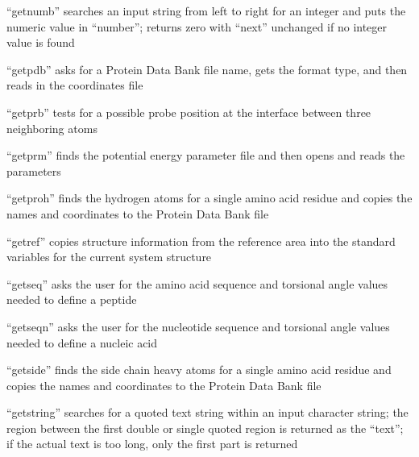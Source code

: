 \documentclass[letterpaper,11pt,english]{sphinxmanual}
\begin{document}
\sphinxAtStartPar
{}

\sphinxAtStartPar
“getnumb” searches an input string from left to right for an integer and puts the numeric value in “number”; returns zero with “next” unchanged if no integer value is found

\sphinxAtStartPar
{}

\sphinxAtStartPar
“getpdb” asks for a Protein Data Bank file name, gets the format type, and then reads in the coordinates file

\sphinxAtStartPar
{}

\sphinxAtStartPar
“getprb” tests for a possible probe position at the interface between three neighboring atoms

\sphinxAtStartPar
{}

\sphinxAtStartPar
“getprm” finds the potential energy parameter file and then opens and reads the parameters

\sphinxAtStartPar
{}

\sphinxAtStartPar
“getproh” finds the hydrogen atoms for a single amino acid residue and copies the names and coordinates to the Protein Data Bank file

\sphinxAtStartPar
{}

\sphinxAtStartPar
“getref” copies structure information from the reference area into the standard variables for the current system structure

\sphinxAtStartPar
{}

\sphinxAtStartPar
“getseq” asks the user for the amino acid sequence and torsional angle values needed to define a peptide

\sphinxAtStartPar
{}

\sphinxAtStartPar
“getseqn” asks the user for the nucleotide sequence and torsional angle values needed to define a nucleic acid

\sphinxAtStartPar
{}

\sphinxAtStartPar
“getside” finds the side chain heavy atoms for a single amino acid residue and copies the names and coordinates to the Protein Data Bank file

\sphinxAtStartPar
{}

\sphinxAtStartPar
“getstring” searches for a quoted text string within an input character string; the region between the first double or single quoted region is returned as the “text”; if the actual text is too long, only the first part is returned
\end{document}
